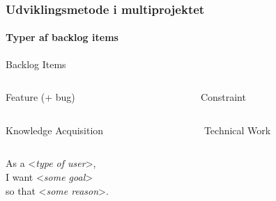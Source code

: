 \begin{frame}
    \frametitle{Udviklingsmetode i multiprojektet}
    \framesubtitle{Typer af backlog items}
      \begin{mtjbox}[backgroundcolor=color1!5, linecolor=color1!40]
        Backlog Items
        \begin{columns}
          \begin{column}{0.48\textwidth}
            \begin{mtjbox}
              Feature (+ bug)
            \end{mtjbox}
          \end{column}
          \begin{column}{0.48\textwidth}
            \begin{mtjbox}
              Constraint
            \end{mtjbox}
          \end{column}
        \end{columns}
        
        \begin{columns}
          \begin{column}{0.48\textwidth}
            \begin{mtjbox}
              Knowledge Acquisition
            \end{mtjbox}
          \end{column}
          \begin{column}{0.48\textwidth}
            \begin{mtjbox}
              Technical Work
            \end{mtjbox}
          \end{column}
        \end{columns}
      \end{mtjbox}
  \centering
  \vspace{.6cm}
  As a <\emph{type of user}>,\\I want <\emph{some goal}>\\so that <\emph{some reason}>.
\end{frame}

